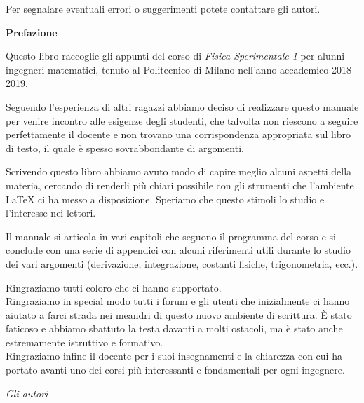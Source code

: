 \documentclass[10pt,a4paper]{book}
\newcommand{\latex}{\LaTeX\xspace}
\begin{document}
Per segnalare eventuali errori o suggerimenti potete contattare gli autori.

\newpage



{\Huge \textbf{Prefazione}}

Questo libro raccoglie gli appunti del corso di \emph{Fisica Sperimentale 1} per alunni ingegneri matematici, tenuto al Politecnico di Milano nell'anno accademico 2018-2019.%

Seguendo l'esperienza di altri ragazzi abbiamo deciso di realizzare questo manuale per venire incontro alle esigenze degli studenti, che talvolta non riescono a seguire perfettamente il docente e non trovano una corrispondenza appropriata sul libro di testo, il quale è spesso sovrabbondante di argomenti.

Scrivendo questo libro abbiamo avuto modo di capire meglio alcuni aspetti della materia, cercando di renderli più chiari possibile con gli strumenti che l'ambiente \latex ci ha messo a disposizione. Speriamo che questo stimoli lo studio e l'interesse nei lettori.

Il manuale si articola in vari capitoli che seguono il programma del corso e si conclude con una serie di appendici con alcuni riferimenti utili durante lo studio dei vari argomenti (derivazione, integrazione, costanti fisiche, trigonometria, ecc.).

Ringraziamo tutti coloro che ci hanno supportato.\\
Ringraziamo in special modo tutti i forum e gli utenti che inizialmente ci hanno aiutato a farci strada nei meandri di questo nuovo ambiente di scrittura. È stato faticoso e abbiamo sbattuto la testa davanti a molti ostacoli, ma è stato anche estremamente istruttivo e formativo.\\
Ringraziamo infine il docente per i suoi insegnamenti e la chiarezza con cui ha portato avanti uno dei corsi più interessanti e fondamentali per ogni ingegnere.

\begin{flushright}
\emph{Gli autori} \hspace*{2cm}
\end{flushright}

\newpage

\end{document}
